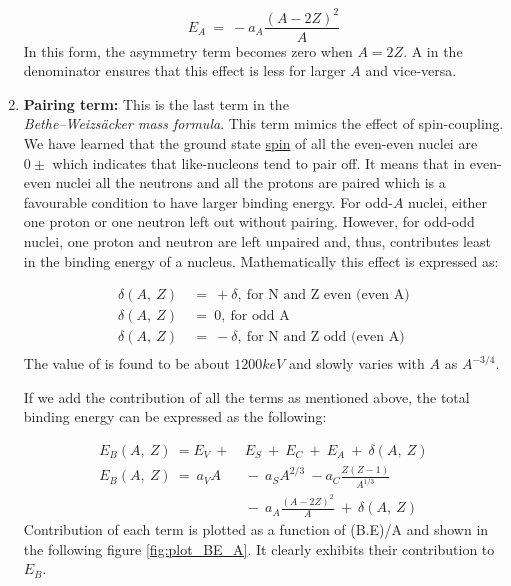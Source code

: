 \documentclass[ebook,12pt,oneside,openany]{memoir}
\begin{document}
\begin{enumerate}[label=\textbf{\Alph*.}]
        \[E_A~=~-a_A\frac{(A-2Z)^2}{A}\]
        \hspace{3em} In this form, the asymmetry term becomes zero when $A = 2Z$. A in the denominator ensures that this effect is less for larger $A$ and vice-versa.
        
    \item \textbf{Pairing term:}    This is the last term in the\\\textit{Bethe–Weizsäcker mass formula}. This term mimics the effect of spin-coupling. We have learned that the ground state \href{https://en.wikipedia.org/wiki/Spin_(physics)}{spin} of all the even-even nuclei are \href{https://drive.google.com/open?id=18RsdVErJJl_99e-parV5QwhS9Gux2CG35fvEiPZISR0}{$0\pm$} which indicates that like-nucleons tend to pair off. It means that in even-even nuclei all the neutrons and all the protons are paired which is a favourable condition to have larger binding energy. For odd-$A$ nuclei, either one proton or one neutron left out without pairing. However, for odd-odd nuclei, one proton and neutron are left unpaired and, thus, contributes least in the binding energy of a nucleus. Mathematically this effect is expressed as:
    
        \begin{equation}
            \begin{split}
                \delta(A,~Z)~&=~+\delta,~ \textrm       {for N and Z even (even A)}\\
                \delta(A,~Z)~&=~0,~ \textrm             {for odd A}\\
                \delta(A,~Z)~&=~-\delta,~ \textrm       {for N and Z odd (even A)}\\
            \end{split}
        \end{equation}
        \hspace{3em} The value of  is found to be about $1200keV$ and slowly varies with $A$ as $A^{-3/4}$.
    
    \par If we add the contribution of all the terms as mentioned above, the total binding energy can be expressed as the following:
    
        \begin{equation}
            \begin{split}
                E_B (A,~Z)~=E_V~+&~E_S~+~E_C~+~E_A~+~\delta(A,~Z)\\
                E_B(A,~Z)~=~a_VA&~-~a_SA^{2/3}~-a_C\frac{Z(Z-1)}{A^{1/3}}\\
                                &~-~a_A\frac{(A-2Z)^2}{A}~+~\delta(A,~Z) 
            \end{split}
        \end{equation}    
        \hspace{3em} Contribution of each term is plotted as a function of (B.E)/A and shown in the following figure \ref{fig:plot_BE_A}. It clearly exhibits their contribution to $E_B$.
        

\end{enumerate}
\end{document}
